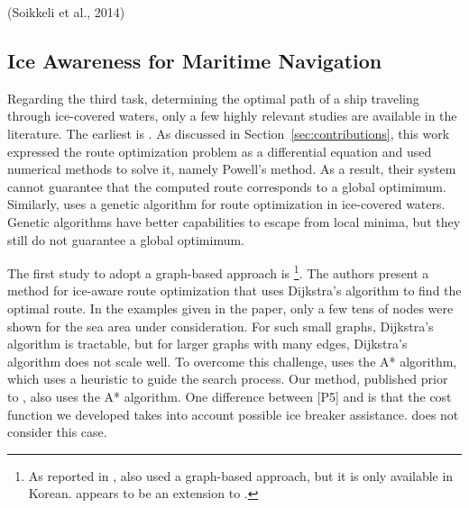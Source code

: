 





(Soikkeli et al., 2014) %

\subsection{Ice Awareness for Maritime Navigation}
\label{sec:ice-awareness-literature}

Regarding the third task, determining the optimal path of a ship traveling through ice-covered waters, only a few highly relevant studies are available in the literature. The earliest is \cite{kotovirta2009system}. As discussed in Section~\ref{sec:contributions}, this work expressed the route optimization problem as a differential equation and used numerical methods to solve it, namely Powell's method. As a result, their system cannot guarantee that the computed route corresponds to a global optimimum. Similarly, \cite{choi2013application} uses a genetic algorithm for route optimization in ice-covered waters. Genetic algorithms have better capabilities to escape from local minima, but they still do not guarantee a global optimimum. 

The first study to adopt a graph-based approach is \cite{nam2013simulation}\footnote{As reported in \cite{choi2013application}, \cite{Park2011} also used a graph-based approach, but it is only available in Korean. \cite{nam2013simulation} appears to be an extension to \cite{Park2011}.}. The authors present a method for ice-aware route optimization that uses Dijkstra's algorithm to find the optimal route. In the examples given in the paper, only a few tens of nodes were shown for the sea area under consideration. For such small graphs, Dijkstra's algorithm is tractable, but for larger graphs with many edges, Dijkstra's algorithm does not scale well. To overcome this challenge, \cite{choi2015arctic} uses the A* algorithm, which uses a heuristic to guide the search process. Our method, published prior to \cite{choi2015arctic}, also uses the A* algorithm. One difference between [P5] and \cite{choi2015arctic} is that the cost function we developed takes into account possible ice breaker assistance. \cite{choi2015arctic} does not consider this case.

